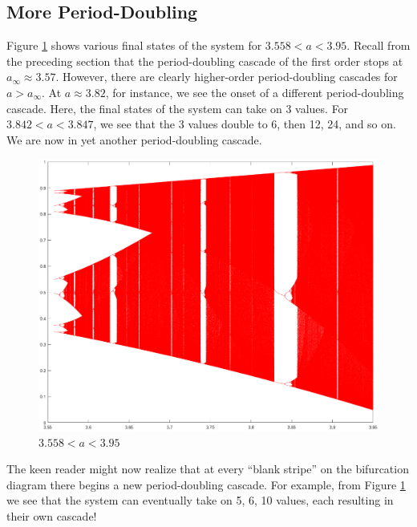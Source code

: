 \documentclass[twocolumn,amsmath,amssymb,aps]{revtex4}
\begin{document}
\subsection{More Period-Doubling}


Figure \ref{fig:odd_period_1} shows various final states of the system for $3.558 < a < 3.95$. Recall from the preceding section that the period-doubling cascade of the first order stops at $a_\infty \approx 3.57$. However, there are clearly higher-order period-doubling cascades for $a>a_\infty$. At $a \approx 3.82$, for instance, we see the onset of a different period-doubling cascade. Here, the final states of the system can take on 3 values. For $ 3.842 < a < 3.847$, we see that the 3 values double to 6, then 12, 24, and so on. We are now in yet another period-doubling cascade. 



\begin{figure}[!htb]
	\centering
	\includegraphics[scale=0.26]{odd_period_1}
	\caption{$3.558 < a < 3.95$}
	\label{fig:odd_period_1}
\end{figure}


The keen reader might now realize that at every ``blank stripe'' on the bifurcation diagram there begins a new period-doubling cascade. For example, from Figure \ref{fig:odd_period_1} we see that the system can eventually take on 5, 6, 10  values, each resulting in their own cascade! 
\end{document}
